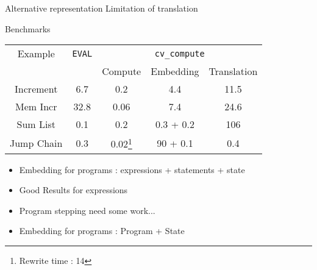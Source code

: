 \documentclass{beamer}
\begin{document}
\begin{frame}{Alternative representation}
  Limitation of translation 

\end{frame}


\begin{frame}{Benchmarks}
  \begin{center}
    \begin{tabular}{| c | c |     c | c | c |}
      \hline
      Example & \texttt{EVAL} & \multicolumn{3}{|c|}{\texttt{cv\_compute}}\\
      \cline{3-5}
              & & Compute & Embedding & Translation \\
      \hline
      \hline
      \cellcolor{green} Increment & 6.7 & 0.2 & 4.4 & 11.5 \\
      \hline
      \cellcolor{green} Mem Incr & 32.8 & 0.06 & 7.4 & 24.6 \\
      \hline
      \hline
      \cellcolor{red} Sum List & 0.1 & 0.2 & 0.3 + 0.2 & 106 \\
      \hline
      \cellcolor{orange} Jump Chain & 0.3 & 0.02\footnote{Rewrite time : 14} & 90 + 0.1 & 0.4 \\
      \hline
    \end{tabular}
  \end{center}
  \begin{itemize}
    \item Embedding for programs : expressions + statements + state
    \item Good Results for expressions
    \item Program stepping need some work...
    \item Embedding for programs : Program + State
  \end{itemize}
  
\end{frame}
\end{document}
